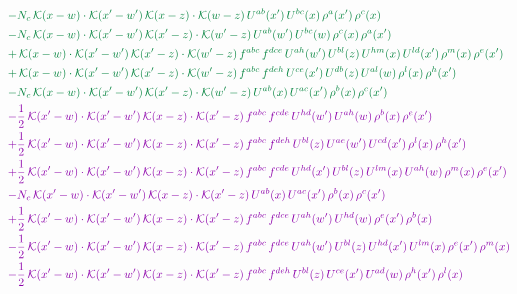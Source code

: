 \documentclass[10pt]{article}
\numberwithin{equation}{section}
\begin{document}
\begin{align}
&{\color{JIM} -N_{c}\,\mathcal{K}(x-w)\cdot\mathcal{K}(x'-w')\,\mathcal{K}(x-z)\cdot\mathcal{K}(w-z)\,U^{ab}(x')\,U^{bc}(x)\,\rho^{a}(x')\,\rho^{c}(x)} \notag\\
&{\color{JIM} -N_{c}\,\mathcal{K}(x-w)\cdot\mathcal{K}(x'-w')\,\mathcal{K}(x'-z)\cdot\mathcal{K}(w'-z)\,U^{ab}(w')\,U^{bc}(w)\,\rho^{c}(x)\,\rho^{a}(x')} \notag\\
&{\color{JIM} +\,\mathcal{K}(x-w)\cdot\mathcal{K}(x'-w')\,\mathcal{K}(x'-z)\cdot\mathcal{K}(w'-z)\,f^{abc}\,f^{dce}\,U^{ah}(w')\,U^{bl}(z)\,U^{hm}(x)\,U^{ld}(x')\,\rho^{m}(x)\,\rho^{e}(x')} \notag\\
&{\color{JIM} +\,\mathcal{K}(x-w)\cdot\mathcal{K}(x'-w')\,\mathcal{K}(x'-z)\cdot\mathcal{K}(w'-z)\,f^{abc}\,f^{deh}\,U^{ce}(x')\,U^{db}(z)\,U^{al}(w)\,\rho^{l}(x)\,\rho^{h}(x')} \notag\\
&{\color{JIM} -N_{c}\,\mathcal{K}(x-w)\cdot\mathcal{K}(x'-w')\,\mathcal{K}(x'-z)\cdot\mathcal{K}(w'-z)\,U^{ab}(x)\,U^{ac}(x')\,\rho^{b}(x)\,\rho^{c}(x')} \notag\\
&{\color{CC} -\frac{1}{2}\,\mathcal{K}(x'-w)\cdot\mathcal{K}(x'-w')\,\mathcal{K}(x-z)\cdot\mathcal{K}(x'-z)\,f^{abc}\,f^{cde}\,U^{hd}(w')\,U^{ah}(w)\,\rho^{b}(x)\,\rho^{e}(x')} \notag\\
&{\color{CC} +\frac{1}{2}\,\mathcal{K}(x'-w)\cdot\mathcal{K}(x'-w')\,\mathcal{K}(x-z)\cdot\mathcal{K}(x'-z)\,f^{abc}\,f^{deh}\,U^{bl}(z)\,U^{ae}(w')\,U^{cd}(x')\,\rho^{l}(x)\,\rho^{h}(x')} \notag\\
&{\color{CC} +\frac{1}{2}\,\mathcal{K}(x'-w)\cdot\mathcal{K}(x'-w')\,\mathcal{K}(x-z)\cdot\mathcal{K}(x'-z)\,f^{abc}\,f^{cde}\,U^{hd}(x')\,U^{bl}(z)\,U^{lm}(x)\,U^{ah}(w)\,\rho^{m}(x)\,\rho^{e}(x')} \notag\\
&{\color{CC} -N_{c}\,\mathcal{K}(x'-w)\cdot\mathcal{K}(x'-w')\,\mathcal{K}(x-z)\cdot\mathcal{K}(x'-z)\,U^{ab}(x)\,U^{ac}(x')\,\rho^{b}(x)\,\rho^{c}(x')} \notag\\
&{\color{CC} +\frac{1}{2}\,\mathcal{K}(x'-w)\cdot\mathcal{K}(x'-w')\,\mathcal{K}(x-z)\cdot\mathcal{K}(x'-z)\,f^{abc}\,f^{dce}\,U^{ah}(w')\,U^{hd}(w)\,\rho^{e}(x')\,\rho^{b}(x)} \notag\\
&{\color{CC} -\frac{1}{2}\,\mathcal{K}(x'-w)\cdot\mathcal{K}(x'-w')\,\mathcal{K}(x-z)\cdot\mathcal{K}(x'-z)\,f^{abc}\,f^{dce}\,U^{ah}(w')\,U^{bl}(z)\,U^{hd}(x')\,U^{lm}(x)\,\rho^{e}(x')\,\rho^{m}(x)} \notag\\
&{\color{CC} -\frac{1}{2}\,\mathcal{K}(x'-w)\cdot\mathcal{K}(x'-w')\,\mathcal{K}(x-z)\cdot\mathcal{K}(x'-z)\,f^{abc}\,f^{deh}\,U^{bl}(z)\,U^{ce}(x')\,U^{ad}(w)\,\rho^{h}(x')\,\rho^{l}(x)} \notag\\

\end{align}
\end{document}
